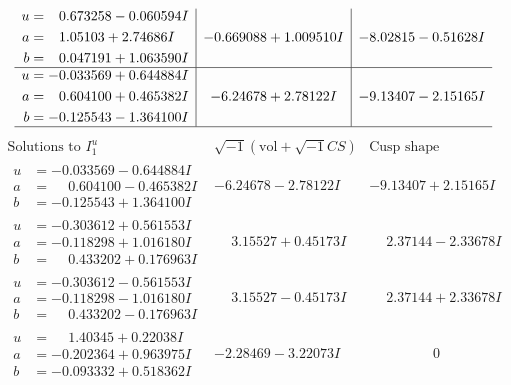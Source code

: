 \documentclass[1p]{elsarticle_modified}
\theoremstyle{definition}
\newcommand{\I}{\sqrt{-1}}
\begin{document}
$$\begin{array}{c|c|c}
\begin{aligned}
u &= \phantom{-}0.673258 - 0.060594 I \\
a &= \phantom{-}1.05103 + 2.74686 I \\
b &= \phantom{-}0.047191 + 1.063590 I\end{aligned}
 & -0.669088 + 1.009510 I & -8.02815 - 0.51628 I \\ \hline\begin{aligned}
u &= -0.033569 + 0.644884 I \\
a &= \phantom{-}0.604100 + 0.465382 I \\
b &= -0.125543 - 1.364100 I\end{aligned}
 & -6.24678 + 2.78122 I & -9.13407 - 2.15165 I\\
 \hline 
 \end{array}$$\newpage$$\begin{array}{c|c|c}  
\text{Solutions to }I^u_{1}& \I (\text{vol} + \sqrt{-1}CS) & \text{Cusp shape}\\
 \hline 
\begin{aligned}
u &= -0.033569 - 0.644884 I \\
a &= \phantom{-}0.604100 - 0.465382 I \\
b &= -0.125543 + 1.364100 I\end{aligned}
 & -6.24678 - 2.78122 I & -9.13407 + 2.15165 I \\ \hline\begin{aligned}
u &= -0.303612 + 0.561553 I \\
a &= -0.118298 + 1.016180 I \\
b &= \phantom{-}0.433202 + 0.176963 I\end{aligned}
 & \phantom{-}3.15527 + 0.45173 I & \phantom{-}2.37144 - 2.33678 I \\ \hline\begin{aligned}
u &= -0.303612 - 0.561553 I \\
a &= -0.118298 - 1.016180 I \\
b &= \phantom{-}0.433202 - 0.176963 I\end{aligned}
 & \phantom{-}3.15527 - 0.45173 I & \phantom{-}2.37144 + 2.33678 I \\ \hline\begin{aligned}
u &= \phantom{-}1.40345 + 0.22038 I \\
a &= -0.202364 + 0.963975 I \\
b &= -0.093332 + 0.518362 I\end{aligned}
 & -2.28469 - 3.22073 I & \phantom{-0.000000 } 0 \\ \hline\begin{aligned}

\end{aligned}
\end{array}$$
\end{document}
